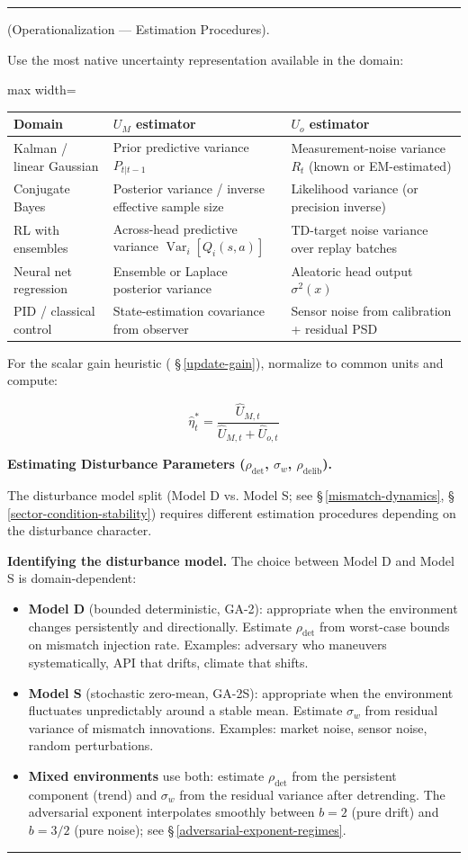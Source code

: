 \documentclass[11pt,oneside]{article}
\newcounter{claim}[section]
\renewcommand{\theclaim}{\thesection.\arabic{claim}}
\newenvironment{segment}[2]{%
  \refstepcounter{claim}%
  \bigskip\noindent\hrule\smallskip
  \noindent{\bfseries #1~\theclaim}\enskip(#2).\par\smallskip
  \noindent\ignorespaces
}{%
  \par\smallskip\noindent\hrule\bigskip
}
\newenvironment{detail}[1][]{\begin{segment}{Detail}{#1}}{\end{segment}}
\begin{document}
\begin{detail}[Operationalization — Estimation Procedures]
Use the most native uncertainty representation available in the domain:

\begin{adjustbox}{max width=\textwidth}
\small
\begin{tabular}{lll}
\toprule
Domain & $U_M$ estimator & $U_o$ estimator \\
\midrule
Kalman / linear Gaussian & Prior predictive variance $P_{t \vert t-1}$ & Measurement-noise variance $R_t$ (known or EM-estimated) \\
Conjugate Bayes & Posterior variance / inverse effective sample size & Likelihood variance (or precision inverse) \\
RL with ensembles & Across-head predictive variance $\operatorname{Var}_i[Q_i(s,a)]$ & TD-target noise variance over replay batches \\
Neural net regression & Ensemble or Laplace posterior variance & Aleatoric head output $\sigma^2(x)$ \\
PID / classical control & State-estimation covariance from observer & Sensor noise from calibration + residual PSD \\
\bottomrule
\end{tabular}
\end{adjustbox}


For the scalar gain heuristic ( \S\,\ref{update-gain}), normalize to common units and compute:


$$\hat{\eta}^*_t = \frac{\hat{U}_{M,t}}{\hat{U}_{M,t} + \hat{U}_{o,t}}$$


\medskip\noindent\textbf{Estimating Disturbance Parameters ($\rho_{\det}$, $\sigma_w$, $\rho_{\text{delib}}$).}


The disturbance model split (Model D vs. Model S; see \S\,\ref{mismatch-dynamics}, \S\,\ref{sector-condition-stability}) requires different estimation procedures depending on the disturbance character.

\textbf{Identifying the disturbance model.} The choice between Model D and Model S is domain-dependent:
\begin{itemize}
  \item \textbf{Model D} (bounded deterministic, GA-2): appropriate when the environment changes persistently and directionally. Estimate $\rho_{\det}$ from worst-case bounds on mismatch injection rate. Examples: adversary who maneuvers systematically, API that drifts, climate that shifts.
  \item \textbf{Model S} (stochastic zero-mean, GA-2S): appropriate when the environment fluctuates unpredictably around a stable mean. Estimate $\sigma_w$ from residual variance of mismatch innovations. Examples: market noise, sensor noise, random perturbations.
  \item \textbf{Mixed environments} use both: estimate $\rho_{\det}$ from the persistent component (trend) and $\sigma_w$ from the residual variance after detrending. The adversarial exponent interpolates smoothly between $b = 2$ (pure drift) and $b = 3/2$ (pure noise); see \S\,\ref{adversarial-exponent-regimes}.
\end{itemize}



\end{detail}
\end{document}
